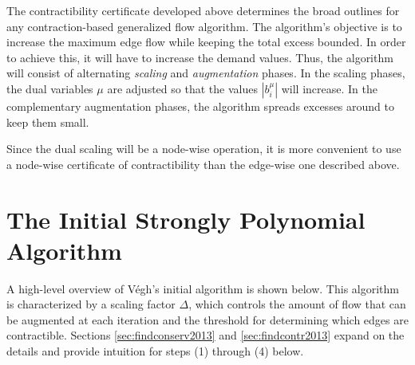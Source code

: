 \documentclass[11pt]{article}
\theoremstyle{definition}
\theoremstyle{definition}
\theoremstyle{definition}
\newcommand{\biu}{b_{i}^{\mu}}
\begin{document}
    The contractibility certificate developed above determines the broad outlines
    for any contraction-based generalized flow algorithm. The algorithm's objective
    is to increase the maximum edge flow while keeping the total excess bounded.
    In order to achieve this, it will have to increase the demand values. Thus, the algorithm
    will consist of alternating \emph{scaling} and \emph{augmentation} phases.
    In the scaling phases, the dual variables $\mu$ are adjusted so that
    the values $|\biu|$ will increase. In the complementary augmentation phases,
    the algorithm spreads excesses around to keep them small.
    
    Since the dual scaling will be a node-wise operation, it is more convenient
    to use a node-wise certificate of contractibility than the edge-wise one described
    above.
    

\section{The Initial Strongly Polynomial Algorithm}
\label{sec:2013}
    \label{sec:2013-notation}




A high-level overview of Végh's initial algorithm \cite{Vegh2013}
is shown below. This algorithm is characterized by a scaling factor $\Delta$,
which controls the amount of flow that can be augmented at each iteration and the threshold for
determining which edges are contractible. Sections \ref{sec:findconserv2013} and
\ref{sec:findcontr2013} expand on the details and provide intuition for steps
(1) through (4) below.
\end{document}
